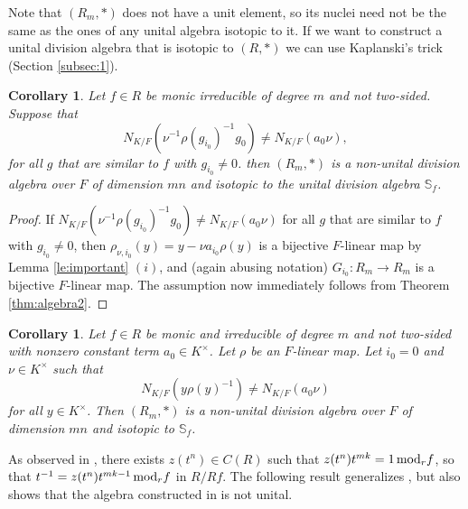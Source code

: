 \documentclass[12pt]{amsart}
\theoremstyle{plain}
\newtheorem{corollary}[theorem]{Corollary}
\theoremstyle{definition}
\numberwithin{equation}{section}
\numberwithin{figure}{section}
\begin{document}
Note that $(R_m,*)$ does not have a unit element, so its nuclei need not be the same as the ones of any unital algebra isotopic to it.
If we want to construct a unital division algebra that is isotopic to $(R,*)$ we can use Kaplanski's trick (Section \ref{subsec:1}).

\begin{corollary}\label{thm:algebra1}
Let $f\in R$ be monic irreducible of degree $m$ and not two-sided.
 Suppose that  $$N_{K/F}(\nu^{-1} \rho(g_{i_0})^{-1}  g_0 )\not= N_{K/F}(a_0 \nu),$$
for all $g$ that are similar to $f$ with $g_{i_0}\not=0$.
then $(R_m,*)$  is a non-unital division algebra over $F$ of dimension $mn$
and isotopic to the unital division algebra $\mathbb{S}_f$.
\end{corollary}

\begin{proof}
If  $N_{K/F}(\nu^{-1} \rho(g_{i_0})^{-1}  g_0 )\not= N_{K/F}(a_0 \nu)$
for all $g$ that are similar to $f$ with $g_{i_0}\not=0$, then $\rho_{\nu,i_0}(y)=y-\nu a_{i_0}\rho(y)$
 is a bijective $F$-linear map by Lemma \ref{le:important} $(i)$, and (again abusing notation)
  $G_{i_0}:R_m \to R_m$ is a bijective $F$-linear map. The assumption now immediately follows from Theorem \ref{thm:algebra2}.
\end{proof}

\begin{corollary} \label{cor: importantcor}
Let $f\in R$ be monic  and irreducible of degree $m$ and not two-sided with nonzero constant term $a_0\in K^\times$. Let $\rho$ be an $F$-linear map. Let $i_0=0$ and $\nu\in K^\times$  such that $$N_{K/F}(y \rho(y)^{-1})\not =N_{K/F}(a_{0} \nu ) $$
for all $y\in K^\times$.
 Then $(R_m,*)$ is a non-unital division algebra over $F$ of dimension $mn$ and isotopic to $\mathbb{S}_f$.
\end{corollary}

As observed in \cite[p.~27]{NewS}, there exists $z(t^n)\in C(R)$ such that $z(t^n)t^{mk}=1\, {\rm mod}_r f$, so that $t^{-1}=z(t^n)t^{mk-1} \, {\rm mod}_r f$ in $R/Rf$. The following result generalizes \cite[Theorem 5.7]{NewS}, but also shows that the algebra constructed in \cite[Theorem 5.7]{NewS} is not unital.
\end{document}
